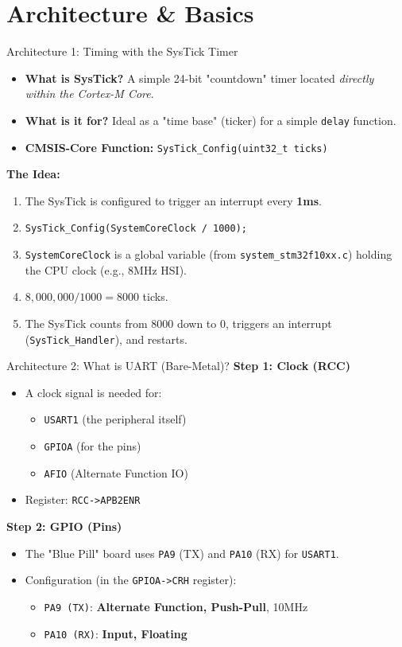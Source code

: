 \documentclass{beamer}
\begin{document}
\section{Architecture \& Basics}

\begin{frame}{Architecture 1: Timing with the SysTick Timer}
	\begin{itemize}
		\item \textbf{What is SysTick?} A simple 24-bit "countdown" timer located \textit{directly within the Cortex-M Core}.
		\item \textbf{What is it for?} Ideal as a "time base" (ticker) for a simple \texttt{delay} function.
		\item \textbf{CMSIS-Core Function:} \texttt{SysTick\_Config(uint32\_t ticks)}
	\end{itemize}
	\textbf{The Idea:}
	\begin{enumerate}
		\item The SysTick is configured to trigger an interrupt every \textbf{1ms}.
		\item \texttt{SysTick\_Config(SystemCoreClock / 1000);}
		\item \texttt{SystemCoreClock} is a global variable (from \texttt{system\_stm32f10xx.c}) holding the CPU clock (e.g., 8MHz HSI).
		\item $8,000,000 / 1000 = 8000$ ticks.
		\item The SysTick counts from 8000 down to 0, triggers an interrupt (\texttt{SysTick\_Handler}), and restarts.
	\end{enumerate}
\end{frame}

\begin{frame}{Architecture 2: What is UART (Bare-Metal)?}
	\textbf{Step 1: Clock (RCC)}
	\begin{itemize}
		\item A clock signal is needed for:
		\begin{itemize}
			\item \texttt{USART1} (the peripheral itself)
			\item \texttt{GPIOA} (for the pins)
			\item \texttt{AFIO} (Alternate Function IO)
		\end{itemize}
		\item Register: \texttt{RCC->APB2ENR}
	\end{itemize}
	
	\textbf{Step 2: GPIO (Pins)}
	\begin{itemize}
		\item The "Blue Pill" board uses \texttt{PA9} (TX) and \texttt{PA10} (RX) for \texttt{USART1}.
		\item Configuration (in the \texttt{GPIOA->CRH} register):
		\begin{itemize}
			\item \texttt{PA9 (TX)}: \textbf{Alternate Function, Push-Pull}, 10MHz
			\item \texttt{PA10 (RX)}: \textbf{Input, Floating}
		\end{itemize}
	\end{itemize}
\end{frame}
\end{document}
